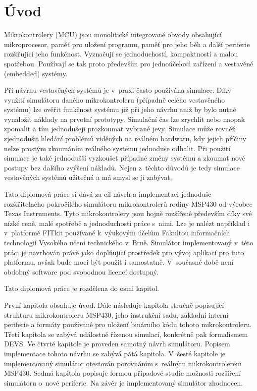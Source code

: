 \chapter{Úvod}

Mikrokontrolery (MCU) jsou monolitické integrované obvody obsahující mikroprocesor, paměť pro uložení programu, paměť pro jeho běh a další periferie
rozšiřující jeho funkčnost. Vyznačují se jednoduchostí, kompaktností a malou spotřebou. Používají se tak proto především pro jednoúčelová zařízení a 
vestavěné (embedded) systémy.

Při návrhu vestavěných systémů je v~praxi často používána simulace. Díky využití simulátoru daného mikrokontroleru (případně celého vestavěného systému) lze ověřit funkčnost systému již při jeho návrhu aniž by bylo nutné vynaložit náklady na prvotní prototypy. Simulační čas lze zrychlit nebo naopak zpomalit a tím jednodušeji prozkoumat vybrané jevy. Simulace může rovněž zjednodušit hledání problémů viděných na reálném hardwaru, kdy jejich příčiny nelze prostým zkoumáním reálného systému jednoduše odhalit. Při použití simulace je také jednodušší vyzkoušet případné změny systému a zkoumat nové postupy bez dalšího zvýšení nákladů. Nejen z~těchto důvodů je tedy simulace vestavěných systémů užitečná a má smysl se jí zabývat.

Tato diplomová práce si dává za cíl návrh a implementaci jednoduše rozšiřitelného pokročilého simulátoru mikrokontrolerů rodiny MSP430 od výrobce Texas Instruments. Tyto mikrokontrolery jsou hojně rozšířené především díky své nízké ceně, malé spotřebě a jednoduchosti práce s~nimi. Lze je nalézt například i v~platformě FITkit \cite{fitkit} používané k~výukovým účelům Fakultou informačních technologií Vysokého učení technického v~Brně. Simulátor implementovaný v~této práci je navrhován právě jako doplňující prostředek pro vývoj aplikací pro tuto platformu, avšak bude moci být použit i samostatně. V~současné době není obdobný software pod svobodnou licencí dostupný.

Tato diplomová práce je rozdělena do osmi kapitol.

První kapitola obsahuje úvod. Dále následuje kapitola stručně popisující strukturu mikrokontroleru MSP430, jeho instrukční sadu, základní interní periferie a formáty používané pro uložení binárního kódu tohoto mikrokontroleru. Třetí kapitola se zabývá událostně řízenou simulací, konkrétně pak formalismem DEVS. Ve čtvrté kapitole je proveden samotný návrh simulátoru. Popisem implementace tohoto návrhu se zabývá pátá kapitola. V~šesté kapitole je implementovaný simulátor otestován porovnáním s~reálným mikrokontrolerem MSP430. Sedmá kapitola popisuje formou případové studie možnosti rozšíření simulátoru o~nové periferie. Na závěr je implementovaný simulátor zhodnocen.

